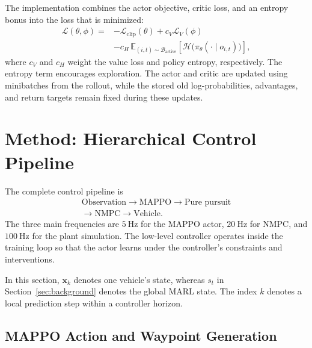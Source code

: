 \documentclass[letterpaper,10pt,conference]{ieeeconf}
\begin{document}
The implementation combines the actor objective, critic loss, and an entropy
bonus into the loss that is minimized:
\begin{equation}
\begin{aligned}
    \mathcal{L}(\theta,\phi)
    ={}&-\mathcal{L}_{\mathrm{clip}}(\theta)
        +c_V\mathcal{L}_{V}(\phi)\\
       &-c_H\,\mathbb{E}_{(i,t)\sim\mathcal{B}_{\mathrm{active}}}\!\left[
          \mathcal{H}\bigl(\pi_\theta(\cdot\mid o_{i,t})\bigr)
        \right],
\end{aligned}
    \label{eq:combined-loss}
\end{equation}
where $c_V$ and $c_H$ weight the value loss and policy entropy, respectively.
The entropy term encourages exploration. The actor and critic are updated
using minibatches from the rollout, while the stored old log-probabilities,
advantages, and return targets remain fixed during these updates.

\section{Method: Hierarchical Control Pipeline}
\label{sec:method}

The complete control pipeline is
\begin{equation}
\begin{gathered}
\text{Observation}\rightarrow\text{MAPPO}\rightarrow\text{Pure pursuit}\\
\rightarrow\text{NMPC}\rightarrow\text{Vehicle}.
\end{gathered}
\end{equation}
The three main frequencies are $5~\mathrm{Hz}$ for the MAPPO actor,
$20~\mathrm{Hz}$ for NMPC, and $100~\mathrm{Hz}$ for the plant simulation.
The low-level controller operates inside the training loop so that the actor
learns under the controller's constraints and interventions.

In this section, $\mathbf{x}_k$ denotes one vehicle's state, whereas $s_t$
in Section~\ref{sec:background} denotes the global MARL state. The index $k$
denotes a local prediction step within a controller horizon.

\subsection{MAPPO Action and Waypoint Generation}
\end{document}
